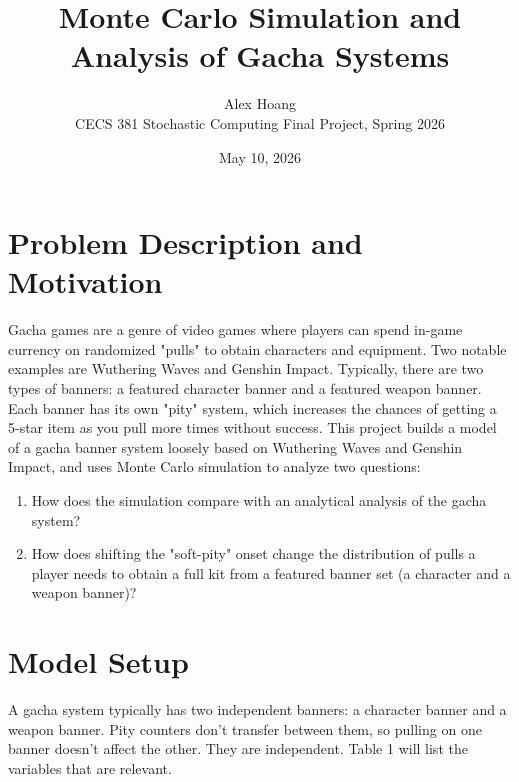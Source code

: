 \documentclass[11pt]{article}
\title{Monte Carlo Simulation and Analysis of Gacha Systems}
\author{Alex Hoang\\
\small CECS 381 Stochastic Computing Final Project, Spring 2026}
\date{May 10, 2026}
\begin{document}
\maketitle

\section{Problem Description and Motivation}

Gacha games are a genre of video games where players can spend in-game currency
on randomized "pulls" to obtain characters and equipment. Two notable examples
are Wuthering Waves and Genshin Impact. Typically, there are two types
of banners: a featured character banner and a featured weapon banner. Each banner has its own
"pity" system, which increases the chances of getting a 5-star item as you pull more times
without success.
This project builds a model of a gacha banner system loosely
based on Wuthering Waves and Genshin Impact, and uses Monte Carlo
simulation to analyze two questions:

\begin{enumerate}
\item How does the simulation compare with an analytical analysis of the gacha system?
\item How does shifting the "soft-pity" onset change the
distribution of pulls a player needs to obtain a full kit from a featured banner set
(a character and a weapon banner)?
\end{enumerate}

\section{Model Setup}

A gacha system typically has two independent banners: a character banner and a
weapon banner. Pity counters don't transfer between them, so pulling
on one banner doesn't affect the other. They are independent. Table 1 will list 
the variables that are relevant.
\end{document}
